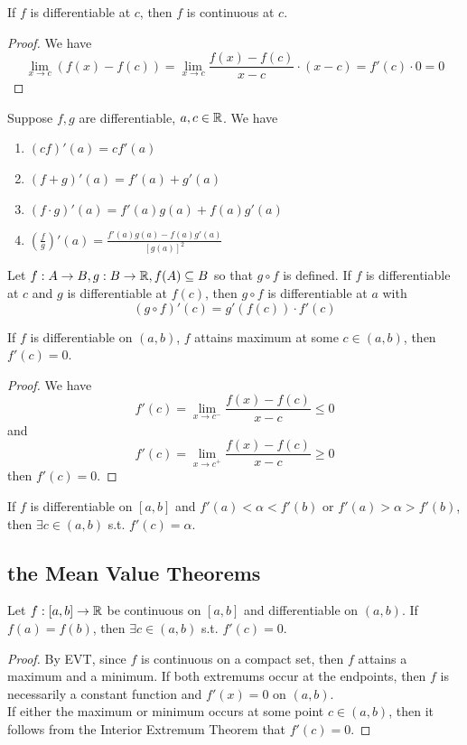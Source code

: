 \documentclass[11pt]{article}
\begin{document}
\property If $f$ is differentiable at $c$, then $f$ is continuous at $c$.
\begin{proof}
	We have
	$$\underset{x \rightarrow c}{\lim} (f(x) - f(c)) = \underset{x \rightarrow c}{\lim} \frac{f(x) - f(c)}{x - c} \cdot (x - c) = f'(c)\cdot 0 = 0$$
\end{proof}

 Suppose $f, g$ are differentiable, $a,c \in \mathbb{R}$. We have
\begin{enumerate}
	\item $(cf)'(a) = cf'(a)$
	\item $(f + g)'(a) = f'(a) + g'(a)$
	\item $(f \cdot g)'(a) = f'(a)g(a) + f(a)g'(a)$
	\item $\left( \frac{f}{g} \right)'(a) = \frac{f'(a)g(a) - f(a)g'(a)}{[g(a)]^2}$
\end{enumerate}

 Let $f: A \rightarrow B, g: B \rightarrow \mathbb{R}, f(A) \subseteq B$ so that $g \circ f$ is defined. If $f$ is differentiable at $c$ and $g$ is differentiable at $f(c)$, then $g \circ f$ is differentiable at $a$ with 
	$$(g \circ f)'(c) = g'(f(c)) \cdot f'(c)$$

 If $f$ is differentiable on $(a,b)$, $f$ attains maximum at some $c \in (a,b)$, then $f'(c) = 0$.
\begin{proof}
	We have
	$$f'(c) = \underset{x \rightarrow c^-}{\lim} \frac{f(x) - f(c)}{x-c} \leq 0$$
	and 
	$$f'(c) = \underset{x \rightarrow c^+}{\lim} \frac{f(x) - f(c)}{x-c} \geq 0$$
	then $f'(c) = 0$.
\end{proof}

 If $f$ is differentiable on $[a,b]$ and $f'(a) < \alpha < f'(b)$ or $f'(a) > \alpha > f'(b)$, then $\exists c \in (a,b)$ s.t. $f'(c) = \alpha$.

\subsection{the Mean Value Theorems}
 Let $f:[a,b] \rightarrow \mathbb{R}$ be continuous on $[a,b]$ and differentiable on $(a,b)$. If $f(a) = f(b)$, then $\exists c\in (a,b)$ s.t. $f'(c) = 0$.
\begin{proof}
	By EVT, since $f$ is continuous on a compact set, then $f$ attains a maximum and a minimum. If both extremums occur at the endpoints, then $f$ is necessarily a constant function and $f'(x) = 0$ on $(a,b)$.\\
	If either the maximum or minimum occurs at some point $c \in (a,b)$, then it follows from the Interior Extremum Theorem that $f'(c) = 0$.
\end{proof}
\end{document}
